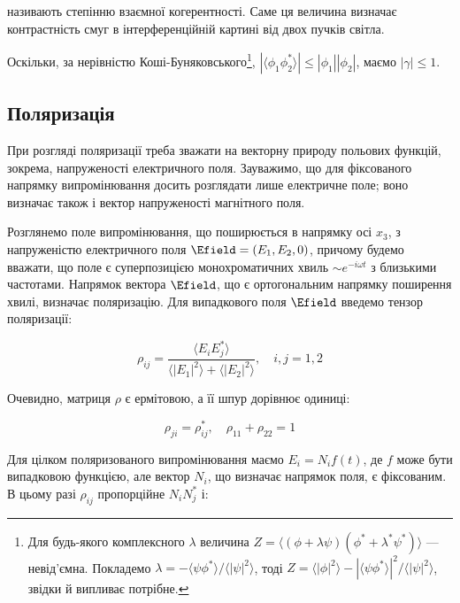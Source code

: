 називають степінню взаємної когерентності. Саме ця величина визначає контрастність смуг в інтерференційній картині від двох пучків світла.

Оскільки, за нерівністю Коші-Буняковського\footnote{Для будь-якого комплексного \(\lambda\) величина \(Z = \langle (\phi + \lambda \psi)(\phi^{*} +
\lambda^{*} \psi^{*}) \rangle\) --- невід’ємна. Покладемо \(\lambda = -\langle \psi \phi^{*} \rangle / \langle |\psi|^2 \rangle\), тоді \(Z = \langle
|\phi|^2 \rangle - |\langle \psi \phi^{*} \rangle|^2 / \langle |\psi|^2 \rangle\), звідки й випливає потрібне.}, \(|\langle \phi_1 \phi_2^{*} \rangle|
\leq |\phi_1||\phi_2|\), маємо \(|\gamma| \leq 1\).

\subsection{Поляризація}

При розгляді поляризації треба зважати на векторну природу польових функцій, зокрема, напруженості електричного поля. Зауважимо, що для фіксованого
напрямку випромінювання досить розглядати лише електричне поле; воно визначає також і вектор напруженості магнітного поля.

Розглянемо поле випромінювання, що поширюється в напрямку осі \(x_3\), з напруженістю електричного поля \(\Efield = (E_1, E_2, 0)\), причому будемо
вважати, що поле є суперпозицією монохроматичних хвиль \(\sim e^{-i\omega t}\) з близькими частотами. Напрямок вектора \(\Efield\), що є ортогональним
напрямку поширення хвилі, визначає поляризацію. Для випадкового поля \(\Efield\) введемо тензор поляризації:

\begin{equation}
\rho_{ij} = \frac{\langle E_i E_j^{*} \rangle}{\langle |E_1|^2 \rangle + \langle |E_2|^2 \rangle}, \quad i, j = 1, 2
\label{eq:polarization_tensor}
\end{equation}

Очевидно, матриця \(\rho\) є ермітовою, а її шпур дорівнює одиниці:

\begin{equation*}
\rho_{ji} = \rho_{ij}^{*}, \quad \rho_{11} + \rho_{22} = 1
\end{equation*}

Для цілком поляризованого випромінювання маємо \(E_i = N_i f(t)\), де \(f\) може бути випадковою функцією, але вектор \(N_i\), що визначає напрямок
поля, є фіксованим. В цьому разі \(\rho_{ij}\) пропорційне \(N_i N_j^{*}\) і:

